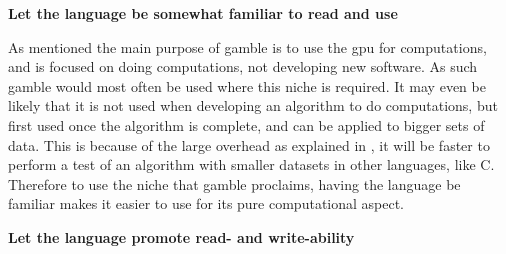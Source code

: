 \textbf{Let the language be somewhat familiar to read and use}

As mentioned the main purpose of \gls{gamble} is to use the \acrshort{gpu} for computations, and is focused on doing computations, not developing new software.
As such \gls{gamble} would most often be used where this niche is required.
It may even be likely that it is not used when developing an algorithm to do computations, but first used once the algorithm is complete, and can be applied to bigger sets of data.
This is because of the large overhead as explained in , it will be faster to perform a test of an algorithm with smaller datasets in other languages, like C.
Therefore to use the niche that \gls{gamble} proclaims, having the language be familiar makes it easier to use for its pure computational aspect.

\textbf{Let the language promote read- and write-ability}


